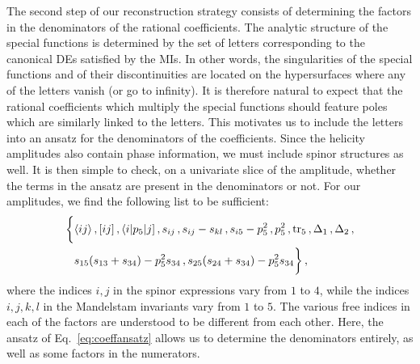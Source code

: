 \documentclass[main.tex]{subfiles}
\begin{document}
The second step of our reconstruction strategy consists of determining the factors in the denominators of the rational coefficients. The analytic structure of the special functions is determined by the set of letters corresponding to the canonical DEs satisfied by the MIs. In other words, the singularities of the special functions and of their discontinuities are located on the hypersurfaces where any of the letters vanish (or go to infinity). It is therefore natural to expect that the rational coefficients which multiply the special functions should feature poles which are similarly linked to the letters. This motivates us to include the letters into an ansatz for the denominators of the coefficients. Since the helicity amplitudes also contain phase information, we must include spinor structures as well. It is then simple to check, on a univariate slice of the amplitude, whether the terms in the ansatz are present in the denominators or not. For our amplitudes, we find the following list to be sufficient:
\begin{equation}
\begin{aligned}
\biggl\{  & \langle ij\rangle \,,  [ij]  \,, \langle i|p_5|j]  \,, s_{ij} \,, s_{ij} - s_{kl} \,, 
  s_{i5} - p_5^2 \,, p_5^2 \,, \operatorname{\rm tr}_5 \, , \Delta_1 \,, \Delta_2 \, , \\
&  s_{15} (s_{13}+s_{34}) - p_5^2  s_{34}  \,,
 s_{25} (s_{24}+s_{34}) - p_5^2  s_{34} \biggr\} \,,
\end{aligned}
\label{eq:coeffansatz}
\end{equation}
where the indices $i,j$ in the spinor expressions vary from $1$ to $4$, while the indices $i,j,k,l$ in the Mandelstam invariants vary from $1$ to $5$. The various free indices in each of the factors are understood to be different from each other. Here, the ansatz of Eq.~\ref{eq:coeffansatz} allows us to determine the denominators entirely, as well as some factors in the numerators.
\end{document}

